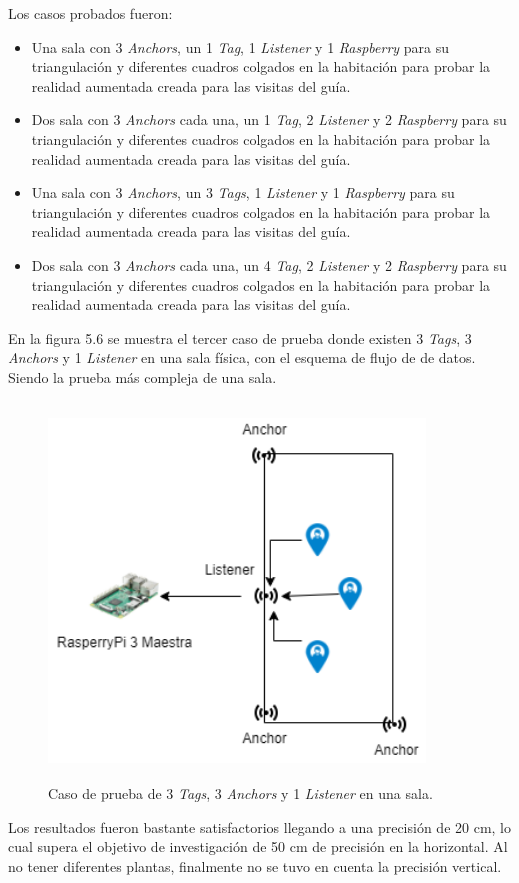Los casos probados fueron:
\begin{itemize}
    \item Una sala con 3 \textit{Anchors}, un 1 \textit{Tag}, 1 \textit{Listener} y 1 \textit{Raspberry} para su triangulación y diferentes cuadros colgados en la habitación para probar la realidad aumentada creada para las visitas del guía.
    \item Dos sala con 3 \textit{Anchors} cada una, un 1 \textit{Tag}, 2 \textit{Listener} y 2 \textit{Raspberry} para su triangulación y diferentes cuadros colgados en la habitación para probar la realidad aumentada creada para las visitas del guía.
    \item Una sala con 3 \textit{Anchors}, un 3 \textit{Tags}, 1 \textit{Listener} y 1 \textit{Raspberry} para su triangulación y diferentes cuadros colgados en la habitación para probar la realidad aumentada creada para las visitas del guía.
    \item Dos sala con 3 \textit{Anchors} cada una, un 4 \textit{Tag}, 2 \textit{Listener} y 2 \textit{Raspberry} para su triangulación y diferentes cuadros colgados en la habitación para probar la realidad aumentada creada para las visitas del guía.
\end{itemize}

En la figura 5.6 se muestra el tercer caso de prueba donde existen 3 \textit{Tags}, 3 \textit{Anchors} y 1 \textit{Listener} en una sala física, con el esquema de flujo de de datos. Siendo la prueba más compleja de una sala.

\begin{figure}[t]
    \centering
    \includegraphics[width=10cm,height=10cm,keepaspectratio]{img/Esquema de coenxiones.png}
    \caption{Caso de prueba de 3 \textit{Tags}, 3 \textit{Anchors} y 1 \textit{Listener} en una sala.}
    \label{fig:app-local-representation}
\end{figure}
Los resultados fueron bastante satisfactorios llegando a una precisión de 20 cm, lo cual supera el objetivo de investigación de 50 cm de precisión en la horizontal. Al no tener diferentes plantas, finalmente no se tuvo en cuenta la precisión vertical.

